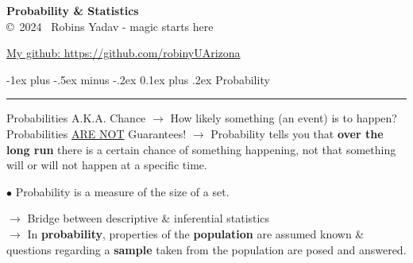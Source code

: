 \documentclass[letterpaper, 10.5pt,landscape]{article}
\makeatletter
\renewcommand{\section}{\@startsection{section}{1}{0mm}%
                                {-1ex plus -.5ex minus -.2ex}%
                                {0.1ex plus .2ex}%
                                {\normalfont\small}}
\makeatother
\begin{document}
\raggedright
\footnotesize

\begin{multicols*}{3}

\setlength{\premulticols}{1pt}
\setlength{\postmulticols}{1pt}
\setlength{\multicolsep}{1pt}
\setlength{\columnsep}{2pt}


\begin{center}
    {\color{teal} \Large{\textbf{Probability \& Statistics}}} \\
   \copyright \ 2024 \  Robins Yadav - magic starts here
\end{center}





\href{https://github.com/robinyUArizona}{My github: https://github.com/robinyUArizona}









\section{Probability} {\color{teal}\hrule height 1pt} \smallskip

Probabilities A.K.A. Chance $\rightarrow$ How likely something (an event) is to happen? Probabilities \underline{ARE NOT} Guarantees! $\rightarrow$ Probability tells you that \textbf{over the long run} there is a certain chance of something happening, not that something will or will not happen at a specific time.

$\bullet$ Probability is a measure of the size of a set.


$\rightarrow$ Bridge between descriptive \& inferential statistics \\
$\rightarrow$ In \textbf{probability}, properties of the \textbf{population} are assumed known \& questions regarding a \textbf{sample} taken from the population are posed and answered. \\


\end{multicols*}
\end{document}
